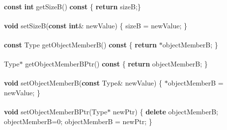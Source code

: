\begin{flushleft}
\hspace*{2\indentation}\mbox{}\\
\hspace*{2\indentation}{\bf inline} {\bf const} {\bf int} getSizeB() {\bf const} \{ {\bf return} sizeB;\}\mbox{}\\
\hspace*{8\indentation}\mbox{}\\
\hspace*{2\indentation}{\bf inline} {\bf void} setSizeB({\bf const} {\bf int}\& newValue) \{ sizeB = newValue; \}\mbox{}\\
\mbox{}\\
\hspace*{2\indentation}{\bf inline} {\bf const} Type getObjectMemberB() {\bf const} \{ {\bf return} $\ast$objectMemberB; \}\mbox{}\\
\mbox{}\\
\hspace*{2\indentation}{\bf inline} Type$\ast$ getObjectMemberBPtr() {\bf const} \{ {\bf return} objectMemberB; \}\mbox{}\\
\mbox{}\\
\hspace*{2\indentation}{\bf inline} {\bf void} setObjectMemberB({\bf const} Type\& newValue) \{ $\ast$objectMemberB = newValue; \}\mbox{}\\
\mbox{}\\
\hspace*{2\indentation}{\bf inline} {\bf void} setObjectMemberBPtr(Type$\ast$ newPtr) \{ {\bf delete} objectMemberB; objectMemberB=0; objectMemberB = newPtr; \}\mbox{}\\

\end{flushleft}
